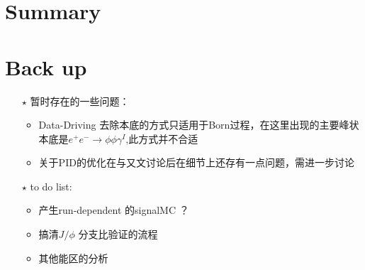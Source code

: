 \documentclass[aspectratio=169]{ctexbeamer}
\begin{document}
\section{Summary}


\section*{Back up}

\begin{frame}
  \begin{itemize}
    \item[$\star$] 暂时存在的一些问题：
    \begin{itemize}
    \item Data-Driving 去除本底的方式只适用于Born过程，在这里出现的主要峰状本底是$e^+e^-\to \phi \phi \gamma^I$,此方式并不合适
    \item 关于PID的优化在与又文讨论后在细节上还存有一点问题，需进一步讨论
    \end{itemize}

    \item[$\star$] to do list:
    \begin{itemize}
      \item 产生run-dependent 的signalMC ？
      \item 搞清$J/\phi$ 分支比验证的流程
      \item 其他能区的分析
    \end{itemize}


    
  \end{itemize}
\end{frame}
\end{document}
